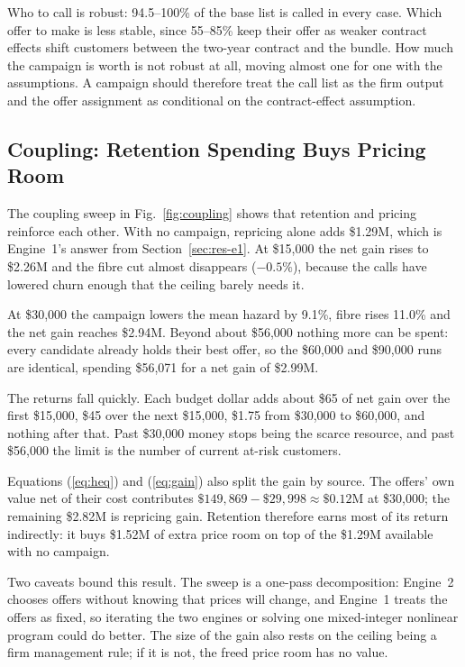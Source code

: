 \documentclass[conference]{IEEEtran}
\begin{document}
Who to call is robust: 94.5--100\% of the base list is called in every case. Which offer to make is less stable, since 55--85\% keep their offer as weaker contract effects shift customers between the two-year contract and the bundle. How much the campaign is worth is not robust at all, moving almost one for one with the assumptions. A campaign should therefore treat the call list as the firm output and the offer assignment as conditional on the contract-effect assumption.

\subsection{Coupling: Retention Spending Buys Pricing Room}
\label{sec:res-coupling}

The coupling sweep in Fig.~\ref{fig:coupling} shows that retention and pricing reinforce each other. With no campaign, repricing alone adds \$1.29M, which is Engine~1's answer from Section~\ref{sec:res-e1}. At \$15,000 the net gain rises to \$2.26M and the fibre cut almost disappears ($-0.5\%$), because the calls have lowered churn enough that the ceiling barely needs it.

At \$30,000 the campaign lowers the mean hazard by 9.1\%, fibre rises 11.0\% and the net gain reaches \$2.94M. Beyond about \$56,000 nothing more can be spent: every candidate already holds their best offer, so the \$60,000 and \$90,000 runs are identical, spending \$56,071 for a net gain of \$2.99M.

The returns fall quickly. Each budget dollar adds about \$65 of net gain over the first \$15,000, \$45 over the next \$15,000, \$1.75 from \$30,000 to \$60,000, and nothing after that. Past \$30,000 money stops being the scarce resource, and past \$56,000 the limit is the number of current at-risk customers.

Equations (\ref{eq:heq}) and (\ref{eq:gain}) also split the gain by source. The offers' own value net of their cost contributes $\$149{,}869 - \$29{,}998 \approx \$0.12$M at \$30,000; the remaining \$2.82M is repricing gain. Retention therefore earns most of its return indirectly: it buys \$1.52M of extra price room on top of the \$1.29M available with no campaign.

Two caveats bound this result. The sweep is a one-pass decomposition: Engine~2 chooses offers without knowing that prices will change, and Engine~1 treats the offers as fixed, so iterating the two engines or solving one mixed-integer nonlinear program could do better. The size of the gain also rests on the ceiling being a firm management rule; if it is not, the freed price room has no value.
\end{document}
